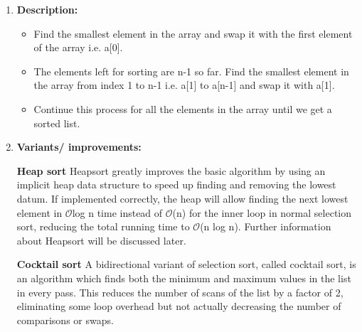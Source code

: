 \documentclass[11pt,a4paper]{article}
\begin{document}
{\begin{enumerate}[label=\textbf{\arabic*})]
				\item \textbf{Description:}
					\begin{itemize}
						\item Find the smallest element in the array and swap it with the first element of the array i.e. a[0].
						\item The elements left for sorting are n-1 so far. Find the smallest element in the array from index 1 to n-1 i.e. a[1] to a[n-1] and swap it with a[1].
						\item Continue this process for all the elements in the array until we get a sorted list.
					\end{itemize}
				
				\item \textbf{Variants/ improvements:}
				
					\textbf{Heap sort}
					Heapsort greatly improves the basic algorithm by using an implicit heap data structure to speed up finding and removing the lowest datum. If implemented correctly, the heap will allow finding the next lowest element in $\mathcal{O}$log n time instead of $\mathcal{O}$(n) for the inner loop in normal selection sort, reducing the total running time to $\mathcal{O}$(n log n). Further information about Heapsort will be discussed later.
					
					\textbf{Cocktail sort}
					A bidirectional variant of selection sort, called cocktail sort, is an algorithm which finds both the minimum and maximum values in the list in every pass. This reduces the number of scans of the list by a factor of 2, eliminating some loop overhead but not actually decreasing the number of comparisons or swaps. 
					

\end{enumerate}}
\end{document}
